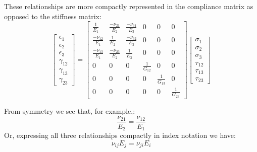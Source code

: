 \documentclass{article}
\begin{document}
These relationships are more compactly represented in the compliance matrix as opposed to the stiffness matrix:
\begin{equation}
\left[
\begin{matrix}
\epsilon_{1}\\
\epsilon_{2}\\
\epsilon_{3}\\
\gamma_{12}\\
\gamma_{13}\\
\gamma_{23}
\end{matrix}
\right]
=
\left[
\begin{matrix}
\frac{1}{E_1} & \frac{-\nu_{21}}{E_2} & \frac{-\nu_{31}}{E_3} & 0 & 0 & 0 \\
\frac{-\nu_{12}}{E_1} & \frac{1}{E_2} & \frac{-\nu_{32}}{E_3} & 0 & 0 & 0 \\
\frac{-\nu_{13}}{E_1} & \frac{-\nu_{23}}{E_2} & \frac{1}{E_3} & 0 & 0 & 0 \\
0 & 0 & 0 & \frac{1}{G_{12}} & 0 & 0 \\
0 & 0 & 0 & 0 & \frac{1}{G_{13}} & 0 \\
0 & 0 & 0 & 0 & 0 & \frac{1}{G_{23}}
\end{matrix}
\right]
\left[
\begin{matrix}
\sigma_{1}\\
\sigma_{2}\\
\sigma_{3}\\
\tau_{12}\\
\tau_{13}\\
\tau_{23}
\end{matrix}
\right]
\label{eq:orthocompliance}
\end{equation}

From symmetry we see that, for example,:
\begin{equation}
\frac{\nu_{21}}{E_2} = \frac{\nu_{12}}{E_1}
\end{equation}
Or, expressing all three relationships compactly in index notation we have:
\begin{equation}
\nu_{ij} E_j = \nu_{ji} E_i
\label{eq:nue}
\end{equation}
\end{document}
